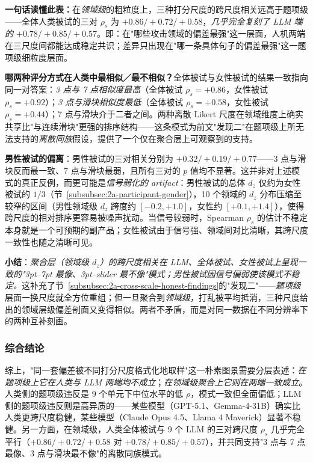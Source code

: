 \documentclass[UTF8,12pt]{ctexart}
\begin{document}
\textbf{一句话读懂此表：}在\emph{领域级}的粗粒度上，三种打分尺度的跨尺度相关远高于题项级——全体人类被试的三对 $\rho_s$ 为 $+0.86 / +0.72 / +0.58$，\emph{几乎完全复刻了 LLM 端的 $+0.78 / +0.85 / +0.57$}。即：在"哪些攻击领域的偏差最强"这一层面，人机两端在三尺度间都能达成稳定共识；差异只出现在"哪一条具体句子的偏差最强"这一题项级细粒度层面。

\textbf{哪两种评分方式在人类中最相似／最不相似？}全体被试与女性被试的结果一致指向同一对答案：\emph{3 点与 7 点相似度最高}（全体被试 $\rho_s = +0.86$，女性被试 $\rho_s = +0.92$）；\emph{3 点与滑块相似度最低}（全体被试 $\rho_s = +0.58$，女性被试 $\rho_s = +0.44$）；7 点与滑块介于二者之间。两种离散 Likert 尺度在领域维度上确实共享比"与连续滑块"更强的排序结构——这条模式为前文"发现二"在题项级上所无法支持的\emph{离散同族}假设，提供了一个仅在聚合层上可观察到的支持。

\textbf{男性被试的偏离}：男性被试的三对相关分别为 $+0.32 / +0.19 / +0.77$——3 点与滑块反而最一致、7 点与滑块最弱，且所有三对的 $p$ 值均不显著。这并非对上述模式的真正反例，而更可能是\emph{信号弱化的 artifact}：男性被试的总体 $d_z$ 仅约为女性被试的 $1/3$（节~\ref{subsubsec:2a-participant-gender}），10 个领域的 $d_z$ 分布压缩至较窄的区间（男性领域级 $d_z$ 跨度约 $[-0.2, +1.0]$，女性约 $[+0.1, +1.4]$），使得跨尺度的相对排序更容易被噪声扰动。当信号较弱时，Spearman $\rho_s$ 的估计不稳定本身就是一个可预期的副产品；女性被试由于信号强、领域间对比清晰，其跨尺度一致性也随之清晰可见。

\textbf{小结}：\emph{聚合层（领域级 $d_z$）的跨尺度相关在 LLM、全体被试、女性被试上呈现一致的"3pt--7pt 最像、3pt--slider 最不像"模式；男性被试因信号偏弱使该模式不稳定。}这补充了节~\ref{subsubsec:2a-cross-scale-honest-findings}的"发现二"——\emph{题项级}层面一换尺度就全方位重组；但一旦聚合到\emph{领域级}，打乱被平均抵消，三种尺度给出的领域层级偏差剖面又变得相似。两者不矛盾，而是对同一数据在不同分辨率下的两种互补刻画。

\subsubsection{综合结论}
\label{subsubsec:2a-cross-scale-conclusion}

综上，"同一套偏差被不同打分尺度格式化地取样"这一朴素图景需要分层表述：\emph{在题项级上它在人类与 LLM 两端均不成立}；\emph{在领域级聚合上它则在两端一致成立}。人类侧的题项级违反是 9 个单元下中位水平的低 $\rho$，模式一致但全面偏低；LLM 侧的题项级违反则是高异质的——某些模型（GPT-5.1、Gemma-4-31B）确实比人类更跨尺度稳健，某些模型（Claude Opus 4.5、Llama 4 Maverick）显著不稳健。另一方面，在领域级，人类全体被试与 9 个 LLM 的三对跨尺度 $\rho_s$ 几乎完全平行（$+0.86 / +0.72 / +0.58$ 对 $+0.78 / +0.85 / +0.57$），并共同支持"3 点与 7 点最像、3 点与滑块最不像"的离散同族模式。
\end{document}
